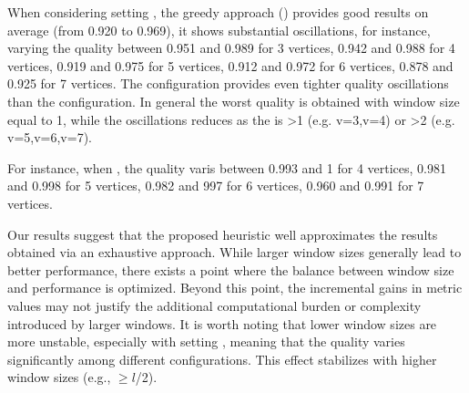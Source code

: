   When considering setting \average, the greedy approach () provides good results on average (from 0.920 to 0.969), it shows substantial oscillations, for instance, varying the quality between 0.951 and 0.989 for 3 vertices, 0.942 and 0.988 for 4 vertices, 0.919 and 0.975 for 5 vertices, 0.912 and 0.972 for 6 vertices, 0.878 and 0.925 for 7 vertices. The \average configuration provides even tighter quality oscillations than the \wide configuration. In general the worst quality is obtained with window size equal to 1, while the oscillations reduces as the \windowsize is >1 (e.g. v=3,v=4) or >2 (e.g. v=5,v=6,v=7).

  For instance, when , the quality varis between  0.993 and 1 for 4 vertices, 0.981 and 0.998 for 5 vertices, 0.982 and 997 for 6 vertices, 0.960 and 0.991 for 7 vertices.


  Our results suggest that the proposed heuristic well approximates the results obtained via an exhaustive approach. While larger window sizes generally lead to better performance, there exists a point where the balance between window size and performance is optimized. Beyond this point, the incremental gains in metric values may not justify the additional computational burden or complexity introduced by larger windows. It is worth noting that lower window sizes are more unstable, especially with setting \wide, meaning that the quality varies significantly among different configurations. This effect stabilizes with higher window sizes (e.g., \windowsize$\geq$$l$/2).

